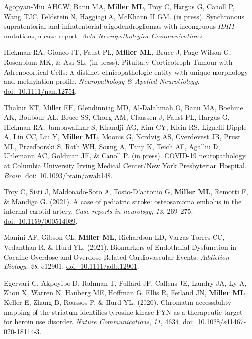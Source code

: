 \documentclass[10pt]{article}
\begin{document}
\begin{description}
\item Agopyan-Miu AHCW, Banu MA, \textbf{Miller ML}, Troy C, Hargus G, Canoll P, Wang TJC, Feldstein N, Haggiagi A, McKhann II GM. (in press). Synchronous supratentorial and infratentorial oligodendrogliomas with incongruous \textit{IDH1} mutations, a case report. \textit{Acta Neuropathologica Communications}.
\item Hickman RA, Gionco JT, Faust PL, \textbf{Miller ML}, Bruce J, Page-Wilson G, Rosenblum MK, \& Asa SL. (in press). Pituitary Corticotroph Tumour with Adrenocortical Cells: A distinct clinicopathologic entity with unique morphology and methylation profile. \textit{Neuropathology \& Applied Neurobiology}. \href{https://doi.org/10.1111/nan.12754}{doi:~10.1111/nan.12754}.
\item Thakur KT, Miller EH, Glendinning MD, Al-Dalahmah O, Banu MA, Boehme AK, Boubour AL, Bruce SS, Chong AM, Claassen J, Faust PL, Hargus G, Hickman RA, Jambawalikar S, Khandji AG, Kim CY, Klein RS, Lignelli-Dipple A, Lin CC, Liu Y, \textbf{Miller ML}, Moonis G, Nordvig AS, Overdevest JB, Prust ML, Przedborski S, Roth WH, Soung A, Tanji K, Teich AF, Agalliu D, Uhlemann AC, Goldman JE, \& Canoll P. (in press). COVID-19 neuropathology at Columbia University Irving Medical Center/New York Presbyterian Hospital. \textit{Brain}. \href{https://doi.org/10.1093/brain/awab148}{doi:~10.1093/brain/awab148}.
\item Troy C, Sisti J, Maldonado-Soto A, Tosto-D'antonio G, \textbf{Miller ML}, Remotti F, \& Mandigo G. (2021). A case of pediatric stroke: osteosarcoma embolus in the internal carotid artery. \textit{Case reports in neurology}, \textit{13}, 269--275. \href{https://doi.org/10.1159/000514089}{doi:~10.1159/000514089}.
\item Manini AF, Gibson CL, \textbf{Miller ML}, Richardson LD, Vargas-Torres CC, Vedanthan R, \& Hurd YL. (2021). Biomarkers of Endothelial Dysfunction in Cocaine Overdose and Overdose-Related Cardiovascular Events. \textit{Addiction Biology}, \textit{26}, e12901. \href{https://doi.org/10.1111/adb.12901}{doi:~10.1111/adb.12901}.
\item Egervari G, Akpoyibo D, Rahman T, Fullard JF, Callens JE, Landry JA, Ly A, Zhou X, Warren N, Hauberg ME, Hoffman G, Ellis R, Ferland JN, \textbf{Miller ML}, Keller E, Zhang B, Roussos P, \& Hurd YL. (2020). Chromatin accessibility mapping of the striatum identifies tyrosine kinase FYN as a therapeutic target for heroin use disorder. \textit{Nature Communications}, \textit{11}, 4634. \href{https://doi.org/10.1038/s41467-020-18114-3}{doi:~10.1038/s41467-020-18114-3}.

\end{description}
\end{document}
